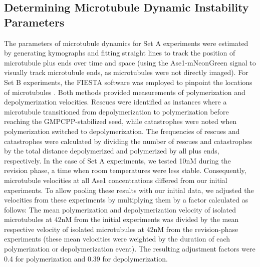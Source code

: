 \subsection{Determining Microtubule Dynamic Instability Parameters}
The parameters of microtubule dynamics for Set A experiments were estimated by generating kymographs and fitting straight lines to track the position of microtubule plus ends over time and space (using the Ase1-mNeonGreen signal to visually track microtubule ends, as microtubules were not directly imaged). For Set B experiments, the FIESTA software was employed to pinpoint the locations of microtubules \parencite{RUHNOW20112820}. Both methods provided measurements of polymerization and depolymerization velocities. Rescues were identified as instances where a microtubule transitioned from depolymerization to polymerization before reaching the GMPCPP-stabilized seed, while catastrophes were noted when polymerization switched to depolymerization. The frequencies of rescues and catastrophes were calculated by dividing the number of rescues and catastrophes by the total distance depolymerized and polymerized by all plus ends, respectively. In the case of Set A experiments, we tested 10nM during the revision phase, a time when room temperatures were less stable. Consequently, microtubule velocities at all Ase1 concentrations differed from our initial experiments. To allow pooling these results with our initial data, we adjusted the velocities from these experiments by multiplying them by a factor calculated as follows: The mean polymerization and depolymerization velocity of isolated microtubules at 42nM from the initial experiments was divided by the mean respective velocity of isolated microtubules at 42nM from the revision-phase experiments (these mean velocities were weighted by the duration of each polymerization or depolymerization event). The resulting adjustment factors were 0.4 for polymerization and 0.39 for depolymerization.

